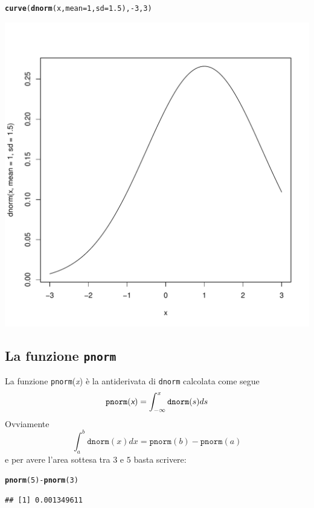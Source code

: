 \documentclass[onecolumn,12pt]{book}\usepackage[]{graphicx}\usepackage[]{color}
\makeatletter
\def\maxwidth{ %
  \ifdim\Gin@nat@width>\linewidth
    \linewidth
  \else
    \Gin@nat@width
  \fi
}
\newcommand{\hlnum}[1]{\textcolor[rgb]{0.686,0.059,0.569}{#1}}%
\newcommand{\hlopt}[1]{\textcolor[rgb]{0,0,0}{#1}}%
\newcommand{\hlstd}[1]{\textcolor[rgb]{0.345,0.345,0.345}{#1}}%
\newcommand{\hlkwc}[1]{\textcolor[rgb]{0.333,0.667,0.333}{#1}}%
\newcommand{\hlkwd}[1]{\textcolor[rgb]{0.737,0.353,0.396}{\textbf{#1}}}%
\newenvironment{kframe}{%
 \def\at@end@of@kframe{}%
 \ifinner\ifhmode%
  \def\at@end@of@kframe{\end{minipage}}%
  \begin{minipage}{\columnwidth}%
 \fi\fi%
 \def\FrameCommand##1{\hskip\@totalleftmargin \hskip-\fboxsep
 \colorbox{shadecolor}{##1}\hskip-\fboxsep
     \hskip-\linewidth \hskip-\@totalleftmargin \hskip\columnwidth}%
 \MakeFramed {\advance\hsize-\width
   \@totalleftmargin\z@ \linewidth\hsize
   \@setminipage}}%
 {\par\unskip\endMakeFramed%
 \at@end@of@kframe}
\newenvironment{knitrout}{}{} %
\newcommand{\varia}[1]{\textsl{\textsf{#1}}}
\makeatother
\begin{document}
\begin{knitrout}
\color{fgcolor}\begin{kframe}
\begin{alltt}
\hlkwd{curve}\hlstd{(}\hlkwd{dnorm}\hlstd{(x,}\hlkwc{mean}\hlstd{=}\hlnum{1}\hlstd{,}\hlkwc{sd}\hlstd{=}\hlnum{1.5}\hlstd{),}\hlopt{-}\hlnum{3}\hlstd{,}\hlnum{3}\hlstd{)}
\end{alltt}
\end{kframe}
\includegraphics[width=\maxwidth]{figure/unnamed-chunk-139-1} 

\end{knitrout}
\subsection{La funzione \texttt{pnorm}}
La funzione \texttt{pnorm}(\varia{x})   \`e la antiderivata di \texttt{dnorm} calcolata come segue
\begin{equation*}\texttt{pnorm}(\varia{x}) =\int_{-\infty}^x  \texttt{dnorm}(s)ds
\end{equation*}
Ovviamente
$$\int_a^b \texttt{dnorm}(x)dx=\texttt{pnorm}(b)-\texttt{pnorm}(a)$$
e per avere l'area sottesa tra $3$ e $5$  basta scrivere:
\begin{knitrout}
\color{fgcolor}\begin{kframe}
\begin{alltt}
\hlkwd{pnorm}\hlstd{(}\hlnum{5}\hlstd{)}\hlopt{-}\hlkwd{pnorm}\hlstd{(}\hlnum{3}\hlstd{)}
\end{alltt}
\begin{verbatim}
## [1] 0.001349611
\end{verbatim}
\end{kframe}
\end{knitrout}
\end{document}
